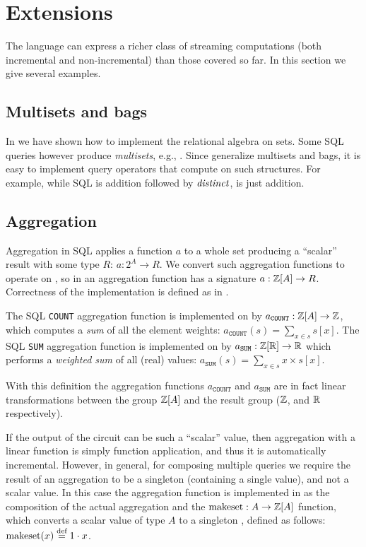 \section{Extensions}\label{sec:extensions}

The \dbsp language can express a richer class of streaming computations (both incremental and non-incremental) than those covered so far. In this section we give several examples.

\subsection{Multisets and bags}

In  we have shown how to implement the relational algebra on sets.
Some SQL queries however produce \emph{multisets}, e.g., .
Since \zrs generalize multisets and bags, it is easy to implement query
operators that compute on such structures.  For example, while SQL 
is \zr addition followed by $\mathit{distinct}$,  is just \zr addition.

\subsection{Aggregation}\label{sec:aggregation}

Aggregation in SQL applies a function $a$ to a whole set producing a ``scalar''
result with some type $R$: $a: 2^A \to R$.  We convert such aggregation
functions to operate on \zrs, so in \dbsp an aggregation function has
a signature $a: \mathbb{Z}[A] \to R$.  Correctness of the implementation is 
defined as in .

The SQL \texttt{COUNT} aggregation function is implemented on \zrs by $a_\texttt{COUNT} : \mathbb{Z}[A] \to \mathbb{Z}$, which
computes a \emph{sum} of all the element weights: $a_\texttt{COUNT}(s) = \sum_{x \in s} s[x]$.
The SQL \texttt{SUM} aggregation function is implemented on \zrs by $a_\texttt{SUM}: \mathbb{Z}[\mathbb{R}] \to \mathbb{R}$ which
performs a \emph{weighted sum} of all (real) values: $a_\texttt{SUM}(s) = \sum_{x \in s} x \times s[x]$.

With this definition the aggregation functions $a_\texttt{COUNT}$ and $a_\texttt{SUM}$ are in
fact linear transformations between the group $\mathbb{Z}[A]$ and the result group ($\mathbb{Z}$, and $\mathbb{R}$ respectively).

If the output of the \dbsp circuit can be such a ``scalar'' value, then aggregation
with a linear function is simply function application, and thus it is automatically incremental.  However, in general, for composing multiple queries
we require the result of an aggregation to be a singleton \zr (containing a single value),
and not a scalar value.  In this case the aggregation function is implemented in
\dbsp as the composition of the actual aggregation and the 
$\mbox{makeset}: A \to \mathbb{Z}[A]$ function, 
which converts a scalar value of type $A$ to a singleton \zr, defined as follows:
$\mbox{makeset}(x) \stackrel{\textrm{\scriptsize def}}{=} 1 \cdot x$.

